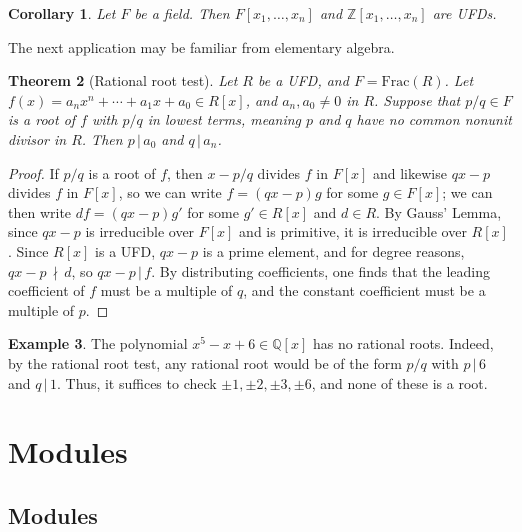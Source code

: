 \documentclass[12pt]{report}
\newtheorem{theorem}{Theorem}[chapter]
\newtheorem{corollary}[theorem]{Corollary}
\numberwithin{equation}{section}
\numberwithin{theorem}{chapter}
\theoremstyle{definition}
\newtheorem{example}[theorem]{Example}
\newtheorem*{basic properties}{Basic Properties}
\newtheorem*{Important Remark}{Important Remark}
\begin{document}
\begin{corollary}
Let $F$ be a field. Then $F[x_1,\dots,x_n]$ and $\mathbb{Z}[x_1,\dots,x_n]$ are UFDs.
\end{corollary}

The next application may be familiar from elementary algebra.


\begin{theorem}[Rational root test]
 Let $R$ be a UFD, and $F=\mathrm{Frac}(R)$.
Let $f(x) = a_n x^n + \cdots + a_1 x + a_0 \in R[x]$, and $a_n,a_0\neq 0$ in $R$. Suppose that $p/q\in F$ is a root of $f$ with $p/q$ in lowest terms, meaning $p$ and $q$ have no common nonunit divisor in $R$. Then $p \, | \, a_0$ and $q \, | \, a_n$.
\end{theorem}
\begin{proof}
If $p/q$ is a root of $f$, then $x-p/q$ divides $f$ in $F[x]$ and likewise $qx-p$ divides $f$ in $F[x]$, so we can write $f= (qx-p)g$ for some $g\in F[x]$; we can then write $df = (qx-p)g'$ for some $g'\in R[x]$ and $d\in R$. By Gauss' Lemma, since $qx-p$ is irreducible over $F[x]$ and is primitive, it is irreducible over $R[x]$. Since $R[x]$ is a UFD, $qx-p$ is a prime element, and  for degree reasons, $qx-p \, \nmid \, d$, so $qx-p \, | \, f$. By distributing coefficients, one finds that the leading coefficient of $f$ must be a multiple of $q$, and the constant coefficient must be a multiple of $p$.
\end{proof}

\begin{example} The polynomial $x^5- x + 6 \in \mathbb{Q}[x]$ has no rational roots. Indeed, by the rational root test, any rational root would be of the form $p/q$ with $p \, | \, 6$ and $q\, | \, 1$. Thus, it suffices to check $\pm 1, \pm 2, \pm 3, \pm 6$, and none of these is a root.
\end{example}















\part{Modules}







\chapter{Modules}
\end{document}
